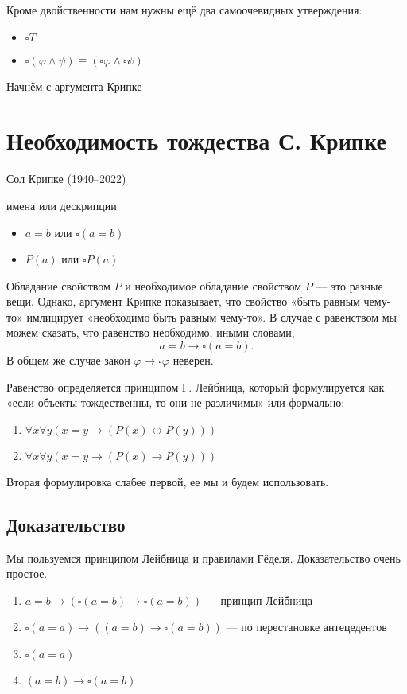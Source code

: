 \documentclass[openany]{book}
\theoremstyle{plain}
\theoremstyle{definition}
\begin{document}
Кроме двойственности нам нужны ещё два самоочевидных утверждения:
\begin{itemize}
\item \(\square T\)
\item \(\square (\varphi \land \psi) \equiv (\square \varphi \land \square \psi)\)
\end{itemize}



Начнём с аргумента Крипке

\section{Необходимость тождества С. Крипке}

Сол Крипке (1940–2022)

имена или дескрипции
\begin{itemize}
\item \(a = b\) или \(\square(a = b)\)
\item \(P(a)\) или \(\square P(a)\)
\end{itemize}

Обладание свойством \(P\) и необходимое обладание свойством \(P\) — это разные вещи. Однако, аргумент Крипке показывает, что свойство «быть равным чему-то» имлицирует «необходимо быть равным чему-то». В случае с равенством мы можем сказать, что равенство необходимо, иными словами, $$a = b \to \square(a = b).$$ В общем же случае закон \(\varphi \to \square \varphi\) неверен.

Равенство определяется принципом Г. Лейбница, который формулируется как «если объекты тождественны, то они не различимы» или формально:
\begin{enumerate}
    \item \(\forall x \forall y (x = y \to (P(x) \leftrightarrow P(y)))\)
    \item \(\forall x \forall y (x = y \to (P(x) \to P(y)))\)
\end{enumerate}

Вторая формулировка слабее первой, ее мы и будем использовать.

\subsection{ Доказательство }
Мы пользуемся принципом Лейбница и правилами Гёделя. Доказательство очень простое.

\begin{enumerate}
\item \(a = b \to (\square(a = b) \to \square(a = b))\) — принцип Лейбница
\item \(\square(a = a) \to ((a = b) \to \square(a = b))\) — по перестановке антецедентов
\item \(\square(a = a)\)
\item \((a = b) \to \square(a = b)\)
\end{enumerate}
\end{document}
